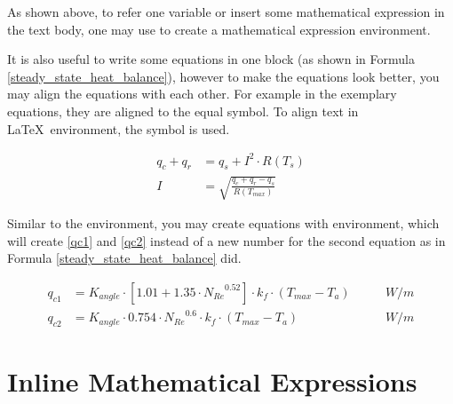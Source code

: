 	As shown above, to refer one variable or insert some mathematical expression in the text body, one may use {\color{blue}{\verb|{$ $}|}} to create a mathematical expression environment.
	
	It is also useful to write some equations in one block (as shown in Formula \ref{steady_state_heat_balance}), however to make the equations look better, you may align the equations with each other. For example in the exemplary equations, they are aligned to the equal symbol. To align text in \LaTeX~environment, the {\color{blue}{\verb|&|}} symbol is used.
	
	\begin{align}
		q_c {+} q_r &= q_s + I^2{\cdot}R \left(T_{s} \right)\\
		I &= \sqrt{\frac{q_c{+}q_r{-}q_s}{R \left(T_{max} \right)}} 
		\label{steady_state_heat_balance}
	\end{align}
	
	Similar to the {\color{blue}{\verb|\aligh|}} environment, you may create equations with {\color{blue}{\verb|\subequations|}} environment, which will create \ref{qc1} and \ref{qc2} instead of a new number for the second equation as in Formula \ref{steady_state_heat_balance} did.
	
	\begin{subequations}
		\begin{align}
		q_{c1} &= K_{angle}{\cdot}\left[1.01{+}1.35{\cdot}{N_{Re}}^{0.52} \right] {\cdot} k_f{\cdot}\left(T_{max}{-}T_a\right) \qquad &W/m \label{qc1}\\ 
		q_{c2} &= K_{angle}{\cdot}0.754{\cdot}{N_{Re}}^{0.6} {\cdot} k_f{\cdot}\left(T_{max}{-}T_a\right) \qquad &W/m \label{qc2}
		\end{align}
	\end{subequations}

\section{Inline Mathematical Expressions}


